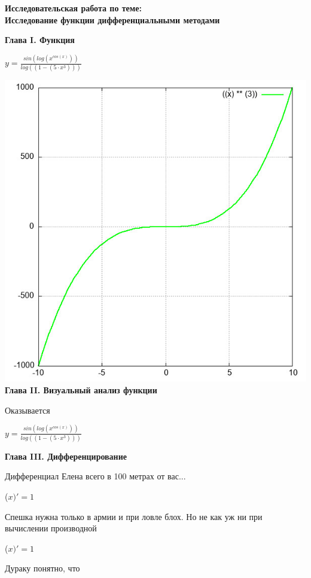 \documentclass[12pt,a4paper,fleqn]{article}
\begin{document}
\begin{center}
\textbf{\LARGE{Исследовательская работа по теме:\\Исследование функции дифференциальными методами}}\end{center}\newpage\textbf{\LARGE Глава I. Функция}

\begin{center}
$y = $$\frac{sin(log(x^{cos(x)}))}{log((1-(5 \cdot x^{3})))}$

\end{center}
\includegraphics{GraphicDumps/plot.jpg}\newpage \textbf{\LARGE Глава II. Визуальный анализ функции}

Оказывается

\begin{center}
$y = $$\frac{sin(log(x^{cos(x)}))}{log((1-(5 \cdot x^{3})))}$

\end{center}
\newpage \textbf{\LAGRE Глава III. Дифференцирование}

Дифференциал Елена всего в 100 метрах от вас...

\begin{center}
 ($x)'
  = 1$\end{center}
Спешка нужна только в армии и при ловле блох. Но не как уж ни при вычислении производной

\begin{center}
 ($x)'
  = 1$\end{center}
Дураку понятно, что
\end{document}
